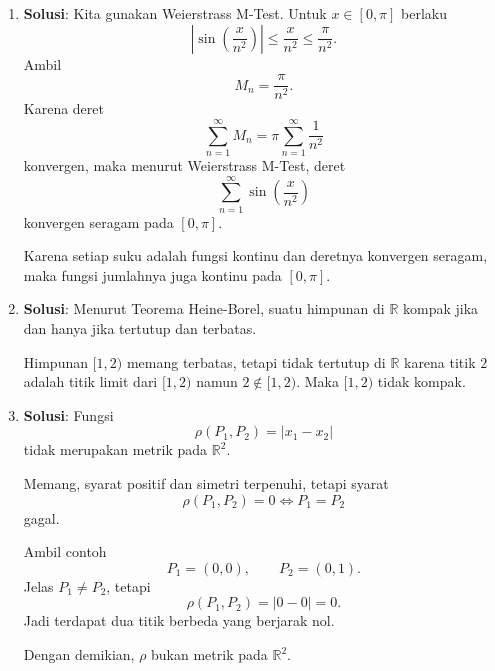 \documentclass[11pt,letterpaper]{article}
\newcommand{\R}{\mathbb{R}}
\newcommand{\jawab}{\textbf{Solusi}:}
\begin{document}
\begin{enumerate}
\begin{enumerate}[label=\alph*)]
                Khususnya,
                \[
                  g(1)=1,
                  \qquad
                  f'(1)=0.
                \]
                Jadi
                \[
                  g(1)\ne f'(1).
                \]
                Ini menunjukkan bahwa meskipun $f_n\to f$ secara uniform, limit turunan tidak selalu sama dengan turunan fungsi limit.
        \end{enumerate}

  \item \jawab
        Kita gunakan Weierstrass M-Test. Untuk $x\in[0,\pi]$ berlaku
        \[
          \left|\sin\left(\frac{x}{n^2}\right)\right|
          \le
          \frac{x}{n^2}
          \le
          \frac{\pi}{n^2}.
        \]
        Ambil
        \[
          M_n=\frac{\pi}{n^2}.
        \]
        Karena deret
        \[
          \sum_{n=1}^{\infty} M_n
          =
          \pi\sum_{n=1}^{\infty}\frac{1}{n^2}
        \]
        konvergen, maka menurut Weierstrass M-Test, deret
        \[
          \sum_{n=1}^{\infty}\sin\left(\frac{x}{n^2}\right)
        \]
        konvergen seragam pada $[0,\pi]$.

        Karena setiap suku adalah fungsi kontinu dan deretnya konvergen seragam, maka fungsi jumlahnya juga kontinu pada $[0,\pi]$.

  \item \jawab
        Menurut Teorema Heine-Borel, suatu himpunan di $\R$ kompak jika dan hanya jika tertutup dan terbatas.

        Himpunan $[1,2)$ memang terbatas, tetapi tidak tertutup di $\R$ karena titik $2$ adalah titik limit dari $[1,2)$ namun $2\notin[1,2)$.
        Maka $[1,2)$ tidak kompak.

  \item \jawab
        Fungsi
        \[
          \rho(P_1,P_2)=|x_1-x_2|
        \]
        tidak merupakan metrik pada $\R^2$.

        Memang, syarat positif dan simetri terpenuhi, tetapi syarat
        \[
          \rho(P_1,P_2)=0 \iff P_1=P_2
        \]
        gagal.

        Ambil contoh
        \[
          P_1=(0,0), \qquad P_2=(0,1).
        \]
        Jelas $P_1\neq P_2$, tetapi
        \[
          \rho(P_1,P_2)=|0-0|=0.
        \]
        Jadi terdapat dua titik berbeda yang berjarak nol.

        Dengan demikian, $\rho$ bukan metrik pada $\R^2$.
\end{enumerate}
\end{document}
